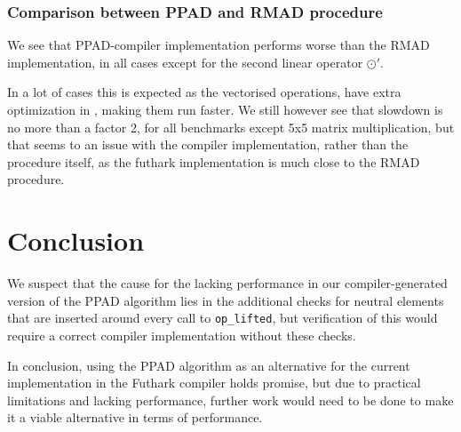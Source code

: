 \documentclass{article}
\begin{document}
\subsubsection*{Comparison between PPAD and RMAD procedure}
We see that PPAD-compiler implementation performs worse than the RMAD
implementation, in all cases except for the second linear operator \(\odot'\).

In a lot of cases this is expected as the vectorised operations, have extra
optimization in \cite{Futhark}, making them run faster.
We still however see that slowdown is no more than a factor 2, for all
benchmarks except 5x5 matrix multiplication, but that seems to an issue with
the compiler implementation, rather than the procedure itself, as the
futhark implementation is much close to the RMAD procedure.
\section{Conclusion}
We suspect that the cause for the lacking performance in our compiler-generated version of the PPAD
algorithm lies in the additional checks for neutral elements that are inserted around
every call to \lstinline{op_lifted}, but verification of this would require a correct
compiler implementation without these checks.

In conclusion, using the PPAD algorithm as an alternative for the current implementation in the
Futhark compiler holds promise, but due to practical limitations and lacking performance, further
work would need to be done to make it a viable alternative in terms of performance.
\printbibliography
\end{document}

